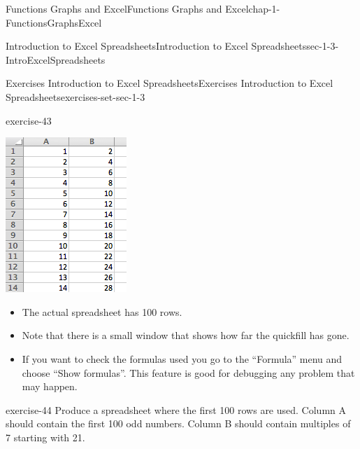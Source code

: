 \documentclass[oneside,10pt,]{book}
\numberwithin{equation}{section}
\begin{document}
\begin{chapterptx}{Functions Graphs and Excel}{}{Functions Graphs and Excel}{}{}{chap-1-FunctionsGraphsExcel}
\begin{sectionptx}{Introduction to Excel Spreadsheets}{}{Introduction to Excel Spreadsheets}{}{}{sec-1-3-IntroExcelSpreadsheets}
\begin{exercises-subsection-numberless}{Exercises Introduction to Excel Spreadsheets}{}{Exercises Introduction to Excel Spreadsheets}{}{}{exercises-set-sec-1-3}
\begin{divisionexercise}{1}{}{}{exercise-43}
\begin{sidebyside}{1}{0.25}{0.25}{0}
\begin{sbspanel}{0.5}
\includegraphics[width=1\linewidth]{images/sec1-3-sol1b.png}
\end{sbspanel}%
\end{sidebyside}%
\leavevmode%
\begin{itemize}[label=\textbullet]
\item{}\hypertarget{p-282}{}%
The actual spreadsheet has 100 rows.%
\item{}\hypertarget{p-283}{}%
Note that there is a small window that shows how far the quickfill has gone.%
\item{}\hypertarget{p-284}{}%
If you want to check the formulas used you go to the “Formula” menu and choose “Show formulas”. This feature is good for debugging any problem that may happen.%
\end{itemize}
\end{divisionexercise}%
\begin{divisionexercise}{2}{}{}{exercise-44}%
\hypertarget{p-285}{}%
Produce a spreadsheet where the first 100 rows are used.  Column A should contain the first 100 odd numbers.  Column B should contain multiples of 7 starting with 21.%

\end{divisionexercise}
\end{exercises-subsection-numberless}
\end{sectionptx}
\end{chapterptx}
\end{document}

